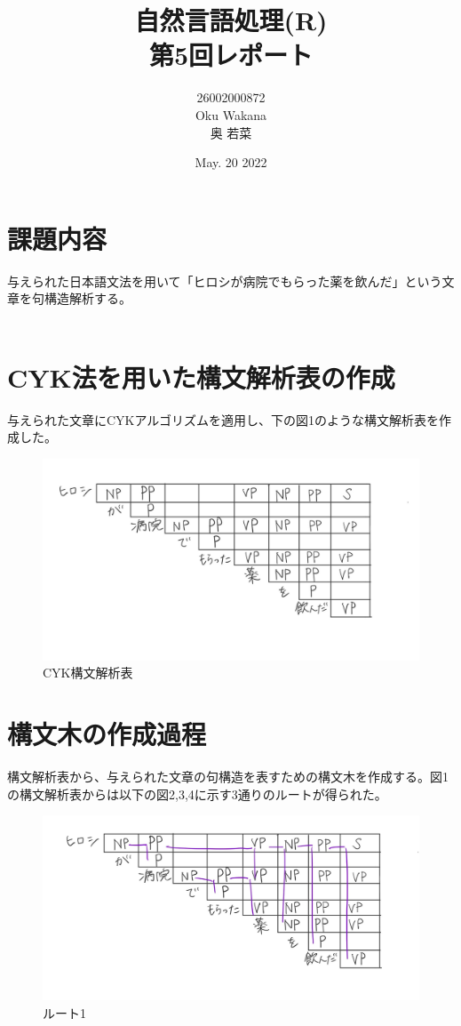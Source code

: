 \documentclass[dvipdfmx,autodetect-engine,titlepage]{jsarticle}
\title{自然言語処理(R)\\
第5回レポート\\
}
\author{26002000872\\Oku Wakana\\奥 若菜}
\date{May. 20 2022}
\begin{document}
\maketitle

\section{課題内容}
与えられた日本語文法を用いて「ヒロシが病院でもらった薬を飲んだ」という文章を句構造解析する。\\\\

\section{CYK法を用いた構文解析表の作成}
与えられた文章にCYKアルゴリズムを適用し、下の図1のような構文解析表を作成した。\\

 \begin{figure}[H]
    \centering
    \includegraphics[scale=0.2]{s1.jpg}
    \caption{CYK構文解析表}\label{fig:図}
\end{figure}

\section{構文木の作成過程}
構文解析表から、与えられた文章の句構造を表すための構文木を作成する。図1の構文解析表からは以下の図2,3,4に示す3通りのルートが得られた。\\

 \begin{figure}[H]
    \centering
    \includegraphics[scale=0.17]{s2.jpg}
    \caption{ルート1}\label{fig:図}
\end{figure}
\end{document}
